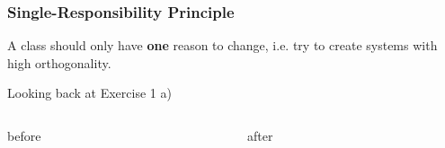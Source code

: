 \documentclass[9pt,handout]{beamer}
\begin{document}
\begin{frame}
  \frametitle{Single-Responsibility Principle}
  \begin{theorem}
    A class should only have \textbf{one} reason to change, i.e. try to create systems with high orthogonality.
  \end{theorem}
\vfill
\pause
\begin{exampleblock}{Looking back at Exercise 1 a)}
  \begin{columns}[t]
    \begin{column}{.48\textwidth}
       \begin{block}{before}

          \begin{center}
          \end{center}
       \end{block}
    \end{column}
\hfill
    \begin{column}{.48\textwidth}
       \begin{block}{after}
       \begin{center}
       \end{center}
      \end{block}
    \end{column}
  \end{columns}
\end{exampleblock}
\end{frame}
\end{document}
